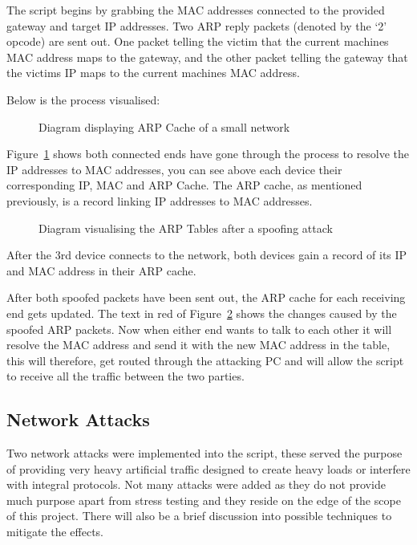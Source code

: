 The script begins by grabbing the MAC addresses connected to the provided gateway and target IP addresses. Two ARP reply packets (denoted by the `2' opcode) are sent out. One packet telling the victim that the current machines MAC address maps to the gateway, and the other packet telling the gateway that the victims IP maps to the current machines MAC address.

Below is the process visualised:


\begin{figure}[h]
	\caption{Diagram displaying ARP Cache of a small network}
	\label{ref:arp_before}
\end{figure}

Figure~\ref{ref:arp_before} shows both connected ends have gone through the process to resolve the IP addresses to MAC addresses, you can see above each device their corresponding IP, MAC and ARP Cache. The ARP cache, as mentioned previously, is a record linking IP addresses to MAC addresses.


\begin{figure}[h]
	\caption{Diagram visualising the ARP Tables after a spoofing attack}
	\label{ref:arp_after}
\end{figure}

After the 3rd device connects to the network, both devices gain a record of its IP and MAC address in their ARP cache. 

After both spoofed packets have been sent out, the ARP cache for each receiving end gets updated. The text in red of Figure~\ref{ref:arp_after} shows the changes caused by the spoofed ARP packets. Now when either end wants to talk to each other it will resolve the MAC address and send it with the new MAC address in the table, this will therefore, get routed through the attacking PC and will allow the script to receive all the traffic between the two parties.

\subsection{Network Attacks}
Two network attacks were implemented into the script, these served the purpose of providing very heavy artificial traffic designed to create heavy loads or interfere with integral protocols. Not many attacks were added as they do not provide much purpose apart from stress testing and they reside on the edge of the scope of this project. There will also be a brief discussion into possible techniques to mitigate the effects. 

